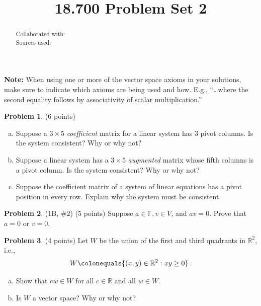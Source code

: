 \documentclass[reqno, 12pt]{amsart}
\theoremstyle{definition}
\newenvironment{problab}[1]
{\noindent\textbf{Problem #1}.}
{\vskip 6pt}
\theoremstyle{remark}
\newcommand{\F}{\mathbb F}
\newcommand{\R}{\mathbb R}
\renewcommand{\abstractname}{}    %
\begin{document}

\title{18.700 Problem Set 2}

\maketitle

\begin{abstract}
  \noindent Collaborated with:\\
  Sources used: 
\end{abstract}
\vskip 0.5cm

\noindent
\textbf{Note:} When using one or more of the vector space axioms in your solutions, make sure to indicate which axioms are being used and how. E.g., ``\dots where the second equality follows by associativity of scalar multiplication.''
\vskip 0.5cm

\begin{problab}{1} (6 points)
  \begin{enumerate}[(a)]
    \item 
      Suppose a $3 \times 5$ \emph{coefficient} matrix for a linear system has $3$ pivot columns. Is the system consistent? Why or why not?
    \item
      Suppose a linear system has a $3 \times 5$ \emph{augmented} matrix whose fifth columns is a pivot column. Is the system consistent? Why or why not?
    \item
      Suppose the coefficient matrix of a system of linear equations has a pivot position in every row. Explain why the system must be consistent.
  \end{enumerate}
\end{problab}

\begin{problab}{2} (1B, \#2) (5 points)
  Suppose $a \in \F, v \in V$, and $av = 0$. Prove that $a=0$ or $v=0$.
\end{problab}

\begin{problab}{3} (4 points)
  Let $W$ be the union of the first and third quadrants in $\R^2$, i.e.,
  \begin{equation*}
    W \colonequals \{(x,y) \in \R^2 : xy \geq 0\} \, .
  \end{equation*}
  \begin{enumerate}[(a)]
    \item Show that $cw \in W$ for all $c \in \R$ and all $w \in W$.
    \item Is $W$ a vector space? Why or why not?
  \end{enumerate}
\end{problab}
\end{document}
